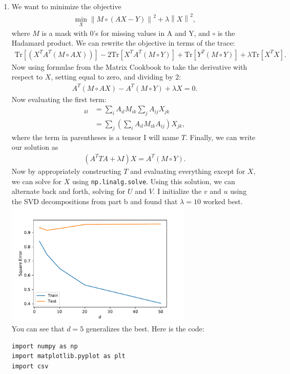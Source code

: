 \documentclass{article}
\newcommand{\norm}[1]{\left\|#1\right\|}
\begin{document}
\begin{enumerate}
        \newpage
        \item We want to minimize the objective
        \begin{align*}
                \min_X \norm{M \circ (AX - Y)}^2 + \lambda \norm{X}^2,
        \end{align*}
        where $M$ is a mask with 0's for missing values in A and Y, and $\circ$ is the Hadamard product.
        We can rewrite the objective in terms of the trace:
        \begin{align*}
                \mathrm{Tr}[(X^T A^T (M \circ AX))] - 2 \mathrm{Tr}[X^T A^T (M \circ Y)] + \mathrm{Tr}[Y^T(M \circ Y)] + \lambda \mathrm{Tr}[X^T X].
        \end{align*}
        Now using formulae from the Matrix Cookbook to take the derivative with respect to $X$, setting equal to zero, and dividing by 2:
        \begin{align*}
                A^T (M \circ AX) - A^T (M \circ Y) + \lambda X = 0.
        \end{align*}
        Now evaluating the first term:
        \begin{align*}
                [A^T (M \circ AX)]_{kl}
                &= \sum_i A_{il} M_{ik} \sum_j A_{ij} X_{jk} \\
                &= \sum_j \left( \sum_i A_{il} M_{ik} A_{ij} \right) X_{jk},
        \end{align*}
        where the term in parentheses is a tensor I will name $T$.
        Finally, we can write our solution as 
        \begin{align*}
                (A^T T A + \lambda I) X = A^T (M \circ Y).
        \end{align*}
        Now by appropriately constructing $T$ and evaluating everything except for $X$, we can solve for $X$ using \texttt{np.linalg.solve}.
        Using this solution, we can alternate back and forth, solving for $U$ and $V$.
        I initialize the $v$ and $u$ using the SVD decompositions from part b and found that $\lambda = 10$ worked best. \\
        \includegraphics[width=0.7\textwidth]{code/B1c.pdf} \\
        You can see that $d=5$ generalizes the best.
        Here is the code:
        \begin{verbatim}
import numpy as np
import matplotlib.pyplot as plt
import csv


\end{verbatim}
\end{enumerate}
\end{document}

